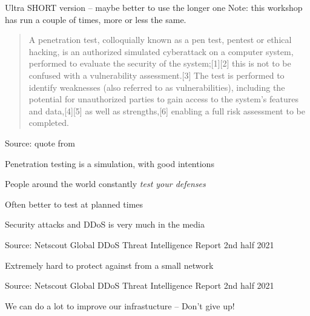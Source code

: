 \documentclass[Screen16to9,17pt]{foils}
\begin{document}


{\Large Ultra SHORT version -- maybe better to use the longer one}
Note: this workshop has run a couple of times, more or less the same.

\hlkprofiluk


\begin{quote}
  A penetration test, colloquially known as a pen test, pentest or ethical hacking, is an authorized simulated cyberattack on a computer system, performed to evaluate the security of the system;[1][2] this is not to be confused with a vulnerability assessment.[3] The test is performed to identify weaknesses (also referred to as vulnerabilities), including the potential for unauthorized parties to gain access to the system's features and data,[4][5] as well as strengths,[6] enabling a full risk assessment to be completed.
\end{quote}
Source: quote from 

\begin{list1}
\item Penetration testing is a simulation, with good intentions
\item People around the world constantly \emph{test your defenses}
\item Often better to test at planned times
\end{list1}


Security attacks and DDoS is very much in the media

{\footnotesize Source: Netscout Global DDoS Threat Intelligence Report 2nd half 2021\\
}


Extremely hard to protect against from a small network


{\footnotesize Source: Netscout Global DDoS Threat Intelligence Report 2nd half 2021\\
}

We can do a lot to improve our infrastucture -- Don't give up!
\end{document}
